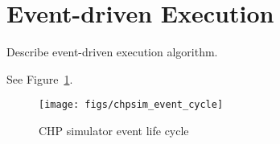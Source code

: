 
\section{Event-driven Execution}
\label{sec:exec}

Describe event-driven execution algorithm.  

See Figure~\ref{fig:event_exec}.

\begin{figure}
\begin{center}
\texttt{[image: figs/chpsim\_event\_cycle]}
\caption{CHP simulator event life cycle}
\label{fig:event_exec}
\end{center}
\end{figure}

